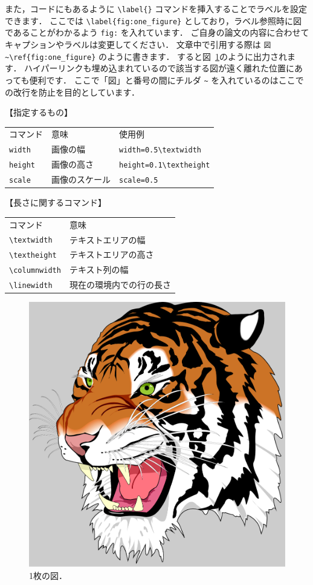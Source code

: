 また，コードにもあるように \verb|\label{}| コマンドを挿入することでラベルを設定できます．
ここでは \verb|\label{fig:one_figure}| としており，ラベル参照時に図であることがわかるよう \verb|fig:| を入れています．
ご自身の論文の内容に合わせてキャプションやラベルは変更してください．
文章中で引用する際は \verb|図~\ref{fig:one_figure}| のように書きます．
すると図~\ref{fig:one_figure}のように出力されます．
ハイパーリンクも埋め込まれているので該当する図が遠く離れた位置にあっても便利です．
ここで「図」と番号の間にチルダ \verb|~| を入れているのはここでの改行を防止を目的としています．

\begin{tcolorbox}[enhanced, title={\texttt{\textbackslash includegraphics} で図の大きさの指定によく使うコマンド}, drop fuzzy shadow]
    【指定するもの】

    \begin{tabular}{lll}
        コマンド    & 意味  & 使用例 \\
        \verb|width|    & 画像の幅          & \verb|width=0.5\textwidth| \\
        \verb|height|   & 画像の高さ        & \verb|height=0.1\textheight|\\
        \verb|scale|    & 画像のスケール    & \verb|scale=0.5|
    \end{tabular}

    【長さに関するコマンド】

    \begin{tabular}{ll}
        コマンド   & 意味 \\
        \verb|\textwidth|   & テキストエリアの幅 \\
        \verb|\textheight|  & テキストエリアの高さ \\
        \verb|\columnwidth| & テキスト列の幅 \\
        \verb|\linewidth|   & 現在の環境内での行の長さ
    \end{tabular}
\end{tcolorbox}

\begin{figure}[tp]
    \centering
    \includegraphics[width=0.5\columnwidth]{figure/tiger.pdf}
    \caption{1枚の図．}
    \label{fig:one_figure}
\end{figure}

